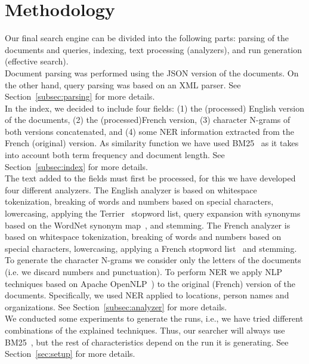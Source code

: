 \section{Methodology}\label{sec:methodology}

Our final search engine can be divided into the following parts: parsing of the documents and queries, indexing,
text processing (analyzers), and run generation (effective search).\\

Document parsing was performed using the JSON version of the documents.
On the other hand, query parsing was based on an XML parser.
See Section~\ref{subsec:parsing} for more details.\\

In the index, we decided to include four fields: (1) the (processed) English version of the documents, (2) the
(processed)French version, (3) character N-grams of both versions concatenated, and (4) some NER information extracted
from the French (original) version.
As similarity function we have used BM25~\cite{BM25} as it takes into account both term frequency and document length.
See Section~\ref{subsec:index} for more details.\\

The text added to the fields must first be processed, for this we have developed four different analyzers.
The English analyzer is based on whitespace tokenization, breaking of words and numbers based on special characters,
lowercasing, applying the Terrier~\cite{OunisEtAl2006} stopword list, query expansion with synonyms based on
the WordNet synonym map~\cite{wordnet}, and stemming.
The French analyzer is based on whitespace tokenization, breaking of words and numbers based on special characters,
lowercasing, applying a French stopword list~\cite{stopword_french} and stemming.
To generate the character N-grams we consider only the letters of the documents (i.e. we discard numbers and punctuation).
To perform NER we apply NLP techniques based on Apache OpenNLP~\cite{ApacheOpenNLP}) to the original (French) version of
the documents.
Specifically, we used NER applied to locations, person names and organizations.
See Section~\ref{subsec:analyzer} for more details.\\

We conducted some experiments to generate the runs, i.e., we have tried different combinations of the explained
techniques.
Thus, our searcher will always use BM25~\cite{BM25}, but the rest of characteristics depend on the run it is generating.
See Section~\ref{sec:setup} for more details.